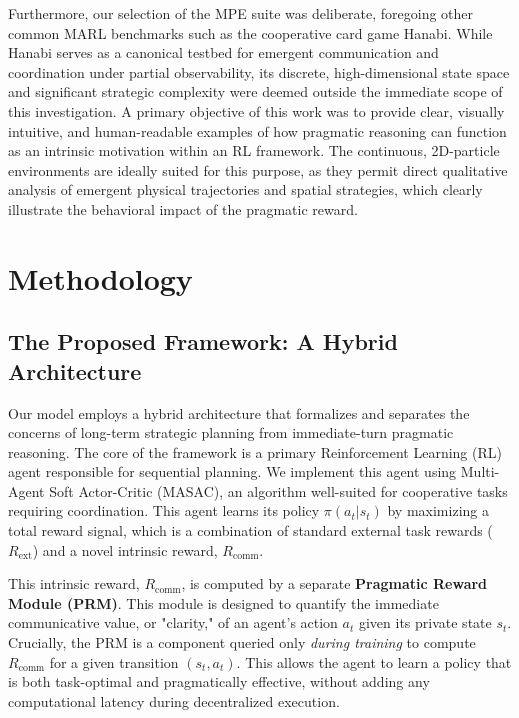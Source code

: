 \documentclass[12pt, a4paper]{report}
\newcommand{\Rcomm}{R_{\text{comm}}}
\newcommand{\Rext}{R_{\text{ext}}}
\begin{document}
Furthermore, our selection of the MPE suite was deliberate, foregoing other common MARL benchmarks such as the cooperative card game Hanabi. While Hanabi serves as a canonical testbed for emergent communication and coordination under partial observability, its discrete, high-dimensional state space and significant strategic complexity were deemed outside the immediate scope of this investigation. A primary objective of this work was to provide clear, visually intuitive, and human-readable examples of how pragmatic reasoning can function as an intrinsic motivation within an RL framework. The continuous, 2D-particle environments are ideally suited for this purpose, as they permit direct qualitative analysis of emergent physical trajectories and spatial strategies, which clearly illustrate the behavioral impact of the pragmatic reward.


\chapter{Methodology}

\section{The Proposed Framework: A Hybrid Architecture}
Our model employs a hybrid architecture that formalizes and separates the concerns of long-term strategic planning from immediate-turn pragmatic reasoning. The core of the framework is a primary Reinforcement Learning (RL) agent responsible for sequential planning. We implement this agent using Multi-Agent Soft Actor-Critic (MASAC), an algorithm well-suited for cooperative tasks requiring coordination. This agent learns its policy $\pi(a_t | s_t)$ by maximizing a total reward signal, which is a combination of standard external task rewards ($\Rext$) and a novel intrinsic reward, $\Rcomm$.

This intrinsic reward, $\Rcomm$, is computed by a separate \textbf{Pragmatic Reward Module (PRM)}. This module is designed to quantify the immediate communicative value, or "clarity," of an agent's action $a_t$ given its private state $s_t$. Crucially, the PRM is a component queried only \textit{during training} to compute $\Rcomm$ for a given transition $(s_t, a_t)$. This allows the agent to learn a policy that is both task-optimal and pragmatically effective, without adding any computational latency during decentralized execution.
\end{document}
